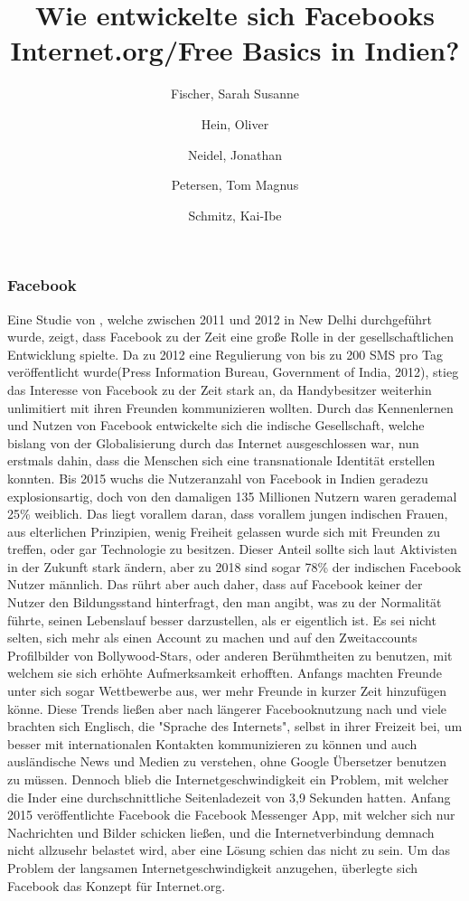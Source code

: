 \documentclass{article}
\title{Wie entwickelte sich Facebooks Internet.org/Free Basics in Indien?}
\author{
  Fischer, Sarah Susanne\\
  \and
  Hein, Oliver\\
  \and
  Neidel, Jonathan\\
  \and
  Petersen, Tom Magnus\\
  \and
  Schmitz, Kai-Ibe\\
}
\begin{document}
\maketitle
\subsubsection {Facebook}
Eine Studie von \textcite{empowermentThroughFacebook}, welche zwischen 2011 und 2012 in New Delhi durchgeführt wurde, zeigt, dass Facebook zu der Zeit eine große Rolle in der gesellschaftlichen Entwicklung spielte. 
\medskip
Da zu 2012 eine Regulierung von bis zu 200 SMS pro Tag veröffentlicht wurde(Press Information Bureau,
Government of India, 2012), stieg das Interesse von Facebook zu der Zeit stark an,
da Handybesitzer weiterhin unlimitiert mit ihren Freunden kommunizieren wollten.
Durch das Kennenlernen und Nutzen von Facebook entwickelte sich die indische Gesellschaft, welche bislang von der Globalisierung durch das Internet ausgeschlossen war, nun erstmals dahin, dass die Menschen sich eine transnationale Identität erstellen konnten.
\medskip
Bis 2015 wuchs die Nutzeranzahl von Facebook in Indien geradezu explosionsartig, doch von den damaligen 135 Millionen Nutzern waren gerademal 25\% weiblich\autocite{slideshareIndia}. Das liegt vorallem daran, dass vorallem jungen indischen Frauen, aus elterlichen Prinzipien, 
wenig Freiheit gelassen wurde sich mit Freunden zu treffen, oder gar Technologie
zu besitzen. Dieser Anteil sollte sich laut Aktivisten in der Zukunft stark ändern, 
aber zu 2018 sind sogar 78\% der indischen Facebook Nutzer männlich. 
\medskip
Das rührt aber auch daher, dass auf Facebook keiner der Nutzer den Bildungsstand hinterfragt, den man angibt, was zu der Normalität führte, seinen Lebenslauf besser darzustellen, als er eigentlich ist. Es sei nicht selten, sich mehr als einen Account zu machen und auf den Zweitaccounts Profilbilder von Bollywood-Stars, oder anderen Berühmtheiten zu benutzen,
mit welchem sie sich erhöhte Aufmerksamkeit erhofften. 
Anfangs machten Freunde unter sich sogar Wettbewerbe aus, wer mehr Freunde in kurzer Zeit hinzufügen könne.
Diese Trends ließen aber nach längerer Facebooknutzung nach und viele brachten sich Englisch, die "Sprache des Internets", 
selbst in ihrer Freizeit bei, um besser mit internationalen Kontakten
kommunizieren zu können und auch ausländische News und Medien zu verstehen, ohne Google Übersetzer benutzen zu müssen.
\medskip
Dennoch blieb die Internetgeschwindigkeit ein Problem, mit welcher die Inder eine durchschnittliche Seitenladezeit von 3,9 Sekunden hatten\autocite{mashable}. Anfang 2015 veröffentlichte Facebook die Facebook Messenger App, mit welcher sich nur Nachrichten und Bilder schicken ließen, und die Internetverbindung demnach nicht allzusehr belastet wird, aber eine Lösung schien das nicht zu sein.
\medskip
Um das Problem der langsamen Internetgeschwindigkeit anzugehen, überlegte sich Facebook das Konzept für Internet.org.



\end{document}
